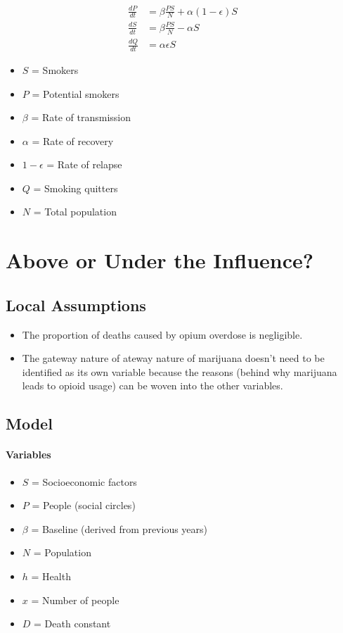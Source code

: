 \documentclass[12pt,letterpaper]{article}
\begin{document}
\begin{singlespace}
\begin{small}
\begin{equation}
\label{eq:1}
\begin{aligned}
\frac{dP}{dt} &= \beta \frac{PS}{N} + \alpha ( 1 - \epsilon )S \\
\frac{dS}{dt} &= \beta \frac{PS}{N} - \alpha S \\
\frac{dQ}{dt} &= \alpha \epsilon S
\end{aligned}
\end{equation}
\begin{itemize}[label=]
  \item $S$ = Smokers
  \item $P$ = Potential smokers
  \item $\beta$ = Rate of transmission
  \item $\alpha$ = Rate of recovery
  \item $1 - \epsilon$ = Rate of relapse
  \item $Q$ = Smoking quitters
  \item $N$ = Total population
\end{itemize}
\end{small}
\end{singlespace}

\section{Above or Under the Influence?}

\subsection{Local Assumptions}

\begin{itemize}
  \item The proportion of deaths caused by opium overdose is negligible.
  \item The gateway nature of ateway nature of marijuana doesn’t need to be identified as its own variable because the reasons (behind why marijuana leads to opioid usage) can be woven into the other variables.
\end{itemize}

\subsection{Model}

\paragraph{Variables}
\begin{itemize}[label=]
  \item $S$ = Socioeconomic factors
  \item $P$ = People (social circles)
  \item $\beta$ = Baseline (derived from previous years)
  \item $N$ = Population
  \item $h$ = Health
  \item $x$ = Number of people
  \item $D$ = Death constant
\end{itemize}
\end{document}
